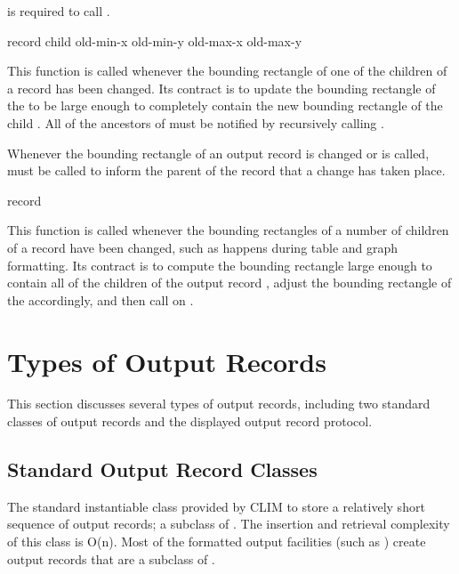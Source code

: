  is required to call .

 {record child 
                                                  old-min-x old-min-y old-max-x old-max-y} 

This function is called whenever the bounding rectangle of one of the children of
a record has been changed.  Its contract is to update the bounding rectangle of
the   to be large enough to completely contain
the new bounding rectangle of the child  .  All
of the ancestors of  must be notified by recursively calling
.

Whenever the bounding rectangle of an output record is changed or
 is called, 
must be called to inform the parent of the record that a change has taken place.

 {record}

This function is called whenever the bounding rectangles of a number of children
of a record have been changed, such as happens during table and graph
formatting.  Its contract is to compute the bounding rectangle large enough to
contain all of the children of the output record , adjust the
bounding rectangle of the   accordingly, and
then call  on .


\section {Types of Output Records}

This section discusses several types of output records, including two standard
classes of output records and the displayed output record protocol.

\subsection {Standard Output Record Classes}


The standard instantiable class provided by CLIM to store a relatively short
sequence of output records; a subclass of .  The insertion and
retrieval complexity of this class is O(n).  Most of the formatted output
facilities (such as ) create output records that are a
subclass of .

